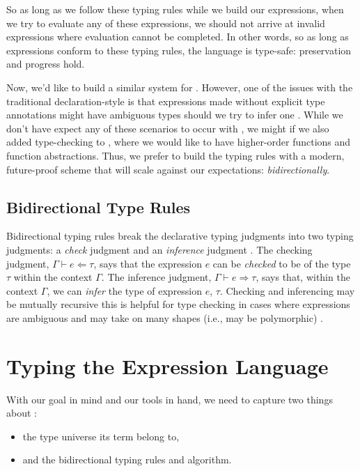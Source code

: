 So as long as we follow these typing rules while we build our expressions, when
we try to evaluate any of these expressions, we should not arrive at invalid
expressions where evaluation cannot be completed. In other words, so as long as
expressions conform to these typing rules, the language is type-safe:
preservation and progress hold.

Now, we'd like to build a similar system for \Expr{}. However, one of the issues
with the traditional declaration-style is that expressions made without explicit
type annotations might have ambiguous types should we try to infer one
\cite{nlab:bidirectional_typechecking}. While we don't have expect any of these
scenarios to occur with \Expr{}, we might if we also added type-checking to
\ModelExpr{}, where we would like to have higher-order functions and function
abstractions. Thus, we prefer to build the typing rules with a modern,
future-proof scheme that will scale against our expectations: \textit{bidirectionally}.

\subsection{Bidirectional Type Rules}
\label{chap:typed-expr:sec:type-safe-expressions:subsec:bidirectional-type-rules}

Bidirectional typing rules break the declarative typing judgments into two
typing judgments: a \textit{check} judgment and an \textit{inference} judgment
\cite{Christiansen2013}. The checking judgment, \(\Gamma{} \vdash{} e \Leftarrow
\tau{}\), says that the expression \(e\) can be \textit{checked} to be of the
type \(\tau\) within the context \(\Gamma\). The inference judgment, \(\Gamma{}
\vdash{} e \Rightarrow \tau{}\), says that, within the context \(\Gamma\), we
can \textit{infer} the type of expression \(e\), \(\tau\). Checking and
inferencing may be mutually recursive \textemdash{} this is helpful for type
checking in cases where expressions are ambiguous and may take on many shapes
(i.e., may be polymorphic) \cite{nlab:bidirectional_typechecking}.

\section{Typing the Expression Language}
\label{chap:typed-expr:sec:typing-the-expression-language}

With our goal in mind and our tools in hand, we need to capture two things about
\Expr{}:
\begin{itemize}
      \item the type universe its term belong to,
      \item and the bidirectional typing rules and algorithm.
\end{itemize}


